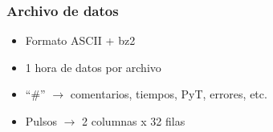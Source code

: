 \documentclass{beamer}
\begin{document}
\begin{frame}
				\frametitle{Archivo de datos}
				\begin{itemize}
								\item Formato ASCII + bz2
								\item 1 hora de datos por archivo
								\item ``\#'' $\to$ comentarios, tiempos, PyT, errores, etc.
								\item Pulsos $\to$ 2 columnas x 32 filas
				\end{itemize}
\end{frame}

\end{document}
